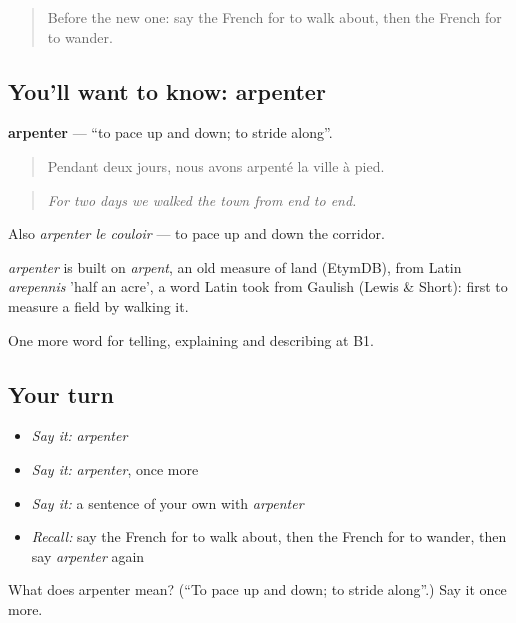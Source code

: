 \label{lesson:FR-C438-arpenter}



\begin{quote}
Before the new one: say the French for to walk about, then the French for to wander.
\end{quote}

\subsection*{You'll want to know: arpenter}
\textbf{arpenter} — \textquotedblleft{}to pace up and down; to stride along\textquotedblright{}.

\begin{quote}
Pendant deux jours, nous avons arpenté la ville à pied.
\end{quote}

\begin{quote}
\emph{For two days we walked the town from end to end.}
\end{quote}

Also \emph{arpenter le couloir} — to pace up and down the corridor.

\begin{cousinweb}
\emph{arpenter} is built on \emph{arpent}, an old measure of land (EtymDB), from Latin \emph{arepennis} 'half an acre', a word Latin took from Gaulish (Lewis \& Short): first to measure a field by walking it.
\end{cousinweb}

\begin{grammarlens}[title={What you've built}]
One more word for telling, explaining and describing at B1.
\end{grammarlens}

\subsection*{Your turn}
\begin{itemize}
\raggedright
  \item \emph{Say it:} \emph{arpenter}
  \item \emph{Say it:} \emph{arpenter}, once more
  \item \emph{Say it:} a sentence of your own with \emph{arpenter}
  \item \emph{Recall:} say the French for to walk about, then the French for to wander, then say \emph{arpenter} again
\end{itemize}

\begin{tcolorbox}[breakable,colback=teal!4,colframe=teal!35!black,title={Before you move on}]
What does arpenter mean? (\textquotedblleft{}To pace up and down; to stride along\textquotedblright{}.) Say it once more.
\end{tcolorbox}

